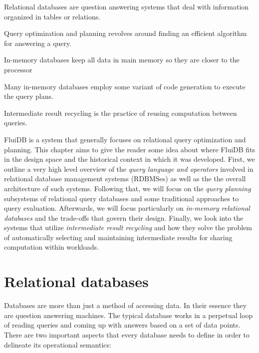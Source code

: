 
\begin{summary}
\item Relational databases are question answering systems that deal
  with information organized in tables or relations.
\item Query optimization and planning revolves around finding an
  efficient algorithm for answering a query.
\item In-memory databases keep all data in main memory so they are
  closer to the processor
\item Many in-memory databases employ some variant of code generation
  to execute the query plans.
\item Intermediate result recycling is the practice of reusing
  computation between queries.
\end{summary}

FluiDB is a system that generally focuses on relational query
optimization and planning. This chapter aims to give the reader some
idea about where FluiDB fits in the design space and the historical
context in which it was developed.  First, we outline a very high
level overview of the \emph{query language and operators} involved in
relational database management systems (RDBMSes) as well as the the overall architecture of such
systems. Following that, we will focus on the \emph{query planning}
subsystems of relational query databases and some traditional
approaches to query evaluation. Afterwards, we will focus particularly
on \emph{in-memory relational databases} and the trade-offs that
govern their design. Finally, we look into the systems that utilize
\emph{intermediate result recycling} and how they solve the problem of
automatically selecting and maintaining intermediate results for
sharing computation within workloads.

\section{Relational databases}

Databases are more than just a method of accessing data. In their
essence they are question answering machines. The typical database
works in a perpetual loop of reading queries and coming up with
answers based on a set of data points. There are two important aspects
that every database needs to define in order to delineate its
operational semantics:

